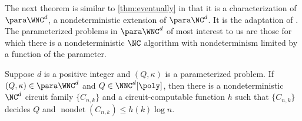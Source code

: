 \documentclass{article}
\DeclareMathOperator{\nondet}{nondet}
\begin{document}
The next theorem is similar to \autoref{thm:eventually} in that it is a characterization of $\para \WNC^d$, a nondeterministic extension of $\para \NC^d$.
It is the adaptation of \autocite[Proposition~3.7]{fg06}.
The parameterized problems in $\para \WNC^d$ of most interest to us are those for which there is a nondeterministic $\NC$ algorithm with nondeterminism limited by a function of the parameter.

\begin{theorem}\label{thm:rmparam}
  Suppose $d$ is a positive integer and $(Q, \kappa)$ is a parameterized problem.
  If $(Q, \kappa) \in \para \WNC^d$ and $Q \in \NNC^d[\poly]$, then there is a nondeterministic $\NC^d$ circuit family $\{C_{n, k}\}$ and a circuit-computable function $h$ such that $\{C_{n, k}\}$ decides $Q$ and $\nondet(C_{n, k}) \leq h(k) \log n$.
\end{theorem}
\end{document}
